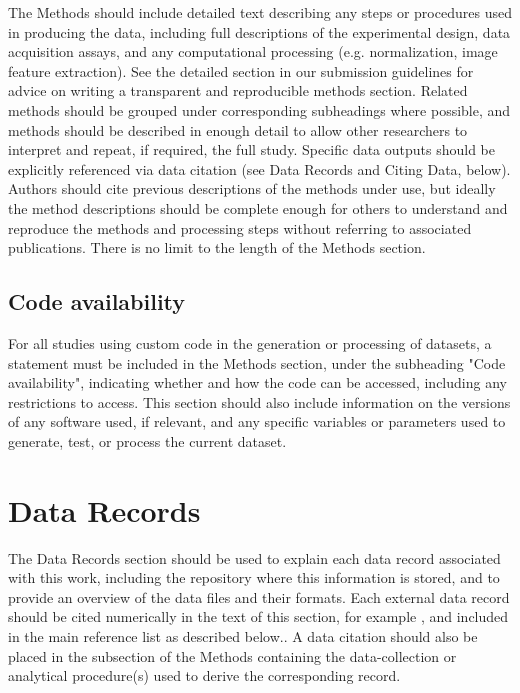 \documentclass[a4paper,10pt,english]{article}
\begin{document}
The Methods should include detailed text describing any steps or procedures used in producing the data, including full descriptions of the experimental design, data acquisition assays, and any computational processing (e.g. normalization, image feature extraction). See the detailed section in our submission guidelines for advice on writing a transparent and reproducible methods section. Related methods should be grouped under corresponding subheadings where possible, and methods should be described in enough detail to allow other researchers to interpret and repeat, if required, the full study. Specific data outputs should be explicitly referenced via data citation (see Data Records and Citing Data, below).
Authors should cite previous descriptions of the methods under use, but ideally the method descriptions should be complete enough for others to understand and reproduce the methods and processing steps without referring to associated publications. There is no limit to the length of the Methods section.


\subsection*{Code availability}

For all studies using custom code in the generation or processing of datasets, a statement must be included in the Methods section, under the subheading "Code availability", indicating whether and how the code can be accessed, including any restrictions to access. This section should also include information on the versions of any software used, if relevant, and any specific variables or parameters used to generate, test, or process the current dataset. 


\section*{Data Records}

The Data Records section should be used to explain each data record associated with this work, including the repository where this information is stored, and to provide an overview of the data files and their formats. Each external data record should be cited numerically in the text of this section, for example \cite{cite3, cite4, cite5, cite6}, and included in the main reference list as described below.. A data citation should also be placed in the subsection of the Methods containing the data-collection or analytical procedure(s) used to derive the corresponding record.
\end{document}

